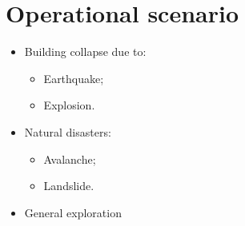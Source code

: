 \section{Operational scenario}

\begin{frame}{\secname}

\begin{itemize}
	\item Building collapse due to:
	\begin{itemize}
		\item Earthquake;
		\item Explosion.
	\end{itemize}
	\item Natural disasters:
	\begin{itemize}
		\item Avalanche;
		\item Landslide.
	\end{itemize}
	
	\item General exploration
\end{itemize}
\end{frame}
